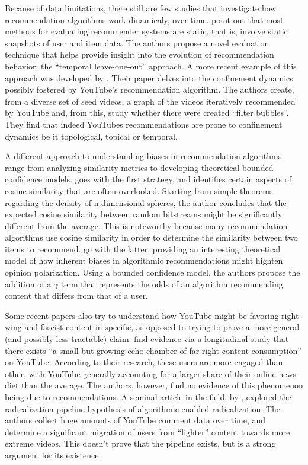 Because of data limitations, there still are few studies that investigate how
recommendation algorithms work dinamicaly, over time.
\citet{burke_evaluating_2010} point out that most methods for evaluating
recommender systems are static, that is, involve static snapshots of user and
item data. The authors propose a novel evaluation technique that helps provide
insight into the evolution of recommendation behavior: the ``temporal
leave-one-out'' approach. A more recent example of this approach was developed
by \citet{roth_tubes_2020}. Their paper delves into the confinement dynamics
possibly fostered by YouTube's recommendation algorithm. The authors create,
from a diverse set of seed videos, a graph of the videos iteratively recommended
by YouTube and, from this, study whether there were created ``filter bubbles''.
They find that indeed YouTubes recommendations are prone to confinement dynamics
be it topological, topical or temporal.

A different approach to understanding biases in recommendation algorithms range
from analyzing similarity metrics to developing theoretical bounded confidence
models. \citet{giller_statistical_2012} goes with the first strategy, and
identifies certain aspects of cosine similarity that are often overlooked.
Starting from simple theorems regarding the density of n-dimensional spheres,
the author concludes that the expected cosine similarity between random
bitstreams might be significantly different from the average. This is noteworthy
because many recommendation algorithms use cosine similarity in order to
determine the similarity between two items to recommend.
\citet{sirbu_algorithmic_2019} go with the latter, providing an interesting
theoretical model of how inherent biases in algorithmic recommendations might
highten opinion polarization. Using a bounded confidence model, the authors
propose the addition of a $\gamma$ term that represents the odds of an algorithm
recommending content that differs from that of a user.

Some recent papers also try to understand how YouTube might be favoring
right-wing and fascist content in specific, as opposed to trying to prove a more
general (and possibly less tractable) claim.
\citet{hosseinmardi_evaluating_2020} find evidence via a longitudinal study that
there exists ``a small but growing echo chamber of far-right content
consumption'' on YouTube. According to their research, these users are more
engaged than other, with YouTube generally accounting for a larger share of
their online news diet than the average. The authors, however, find no evidence
of this phenomenon being due to recommendations. A seminal article in the field,
by \citet{ribeiro_auditing_2020}, explored the radicalization pipeline
hypothesis of algorithmic enabled radicalization. The authors collect huge
amounts of YouTube comment data over time, and determine a significant migration
of users from ``lighter'' content towards more extreme videos. This doesn't
prove that the pipeline exists, but is a strong argument for its existence.

